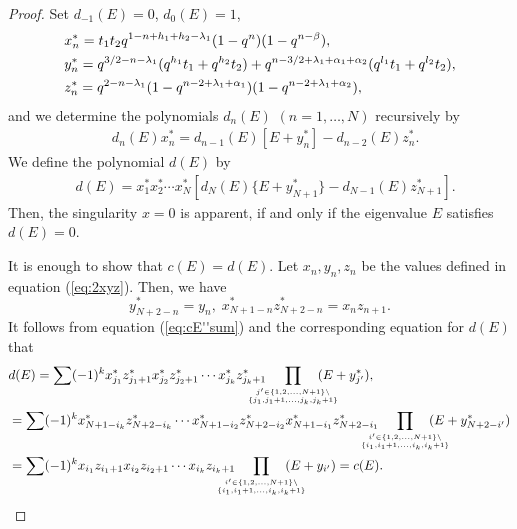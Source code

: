\documentclass[12pt]{amsart}
\numberwithin{equation}{section}
\theoremstyle{definition}
\theoremstyle{remark}
\begin{document}
\begin{proof}
Set $d_{-1}(E)=0 $,  $d_0(E)=1 $,
\begin{align*}
 & x^* _n = t_{1}t_{2}q^{  1- n + h_{1} + h_{2} - \lambda _{1}} (1 - q^{n})(1 - q^{n - \beta }) , \\
 & y^* _n = q^{3/2- n - \lambda _{1} } (q^{h_{1}}t_{1} + q^{h_{2}}t_{2} ) + q^{n - 3/2 + \lambda _{1} + \alpha _{1} + \alpha _{2} }( q^{l_{1}}t_{1} + q^{l_{2}}t_{2} ) , \notag \\
 & z^* _n = q^{ 2- n - \lambda _{1} } (1 - q^{n - 2 + \lambda _{1} + \alpha _{1} })(1 - q^{n - 2 + \lambda _{1} + \alpha _{2} }) , \notag
\end{align*}
and we determine the polynomials $d_n(E)$ $(n=1,\dots ,N)$ recursively by
\begin{align}
 & d_{n} (E) x^* _n = d_{n - 1} (E) [E + y^* _n ] -d_{n-2} (E) z^* _n . \label{eq:dnE}
\end{align}
We define the polynomial $d (E)$ by
\begin{align}
 & d (E) = x^* _1 x^* _2 \cdots x^* _{N} [ d_{N} (E) \{ E + y^* _{N+1} \} - d_{N-1} (E) z^* _{N+1} ] . \label{eq:dE}
\end{align}
Then, the singularity $x=0$ is apparent, if and only if the eigenvalue $E$ satisfies $d(E)=0$.

It is enough to show that $c(E) = d(E)$.
Let $x_n , y_n, z_n$ be the values defined in equation (\ref{eq:2xyz}).
Then, we have
\begin{equation*}
y^* _{N+2-n} =y_n , \; x^* _{N+1-n} z^* _{N+2-n} = x_n z_{n+1} .
\end{equation*}
It follows from equation (\ref{eq:cE''sum}) and the corresponding equation for $d(E)$ that
\begin{align*}
 & d (E) = \sum (-1) ^k x^* _{j_1} z^* _{j_1 +1 } x^* _{j_2} z^* _{j_2 +1 } \cdots x^* _{j_k} z^* _{j_k +1 } \! \! \! \! \! \! \! \! \! \!  \prod _{j' \in \{ 1,2, \dots ,N +1 \} \setminus \atop{\{ j_1 , j_1 +1 , \dots , j_k , j_k +1  \} }} \! \! \! \! \! \! \! \! \! \! (E + y^* _{j'} ) , \\
& = \sum (-1) ^k x^* _{N+1 - i_k} z^* _{N +2 - i_k } \cdots x^* _{N+1 -i_2} z^* _{N+2 - i_2 } x^* _{N+1 -i_1} z^* _{N+2 -i_1 } \! \! \! \! \! \! \! \! \! \! \prod _{i' \in \{ 1,2, \dots ,N +1 \} \setminus \atop{\{ i_1 , i_1 +1 , \dots , i_k , i_k +1  \} }}  \! \! \! \! \! \! \! \! \! \!  (E + y^* _{N+2-i'} ) \notag \\
 &  = \sum (-1) ^k x _{i_1} z _{i_1 +1 } x _{i_2} z _{i_2 +1 } \cdots x _{i_k} z _{i_k +1 } \! \! \! \! \! \! \! \! \! \!  \prod _{i' \in \{ 1,2, \dots ,N +1 \} \setminus \atop{\{ i_1 , i_1 +1 , \dots , i_k , i_k +1  \} }} \! \! \! \! \! \! \! \! \! \! (E + y _{i'} ) = c(E) . \notag 
\end{align*}
\end{proof}
\end{document}
